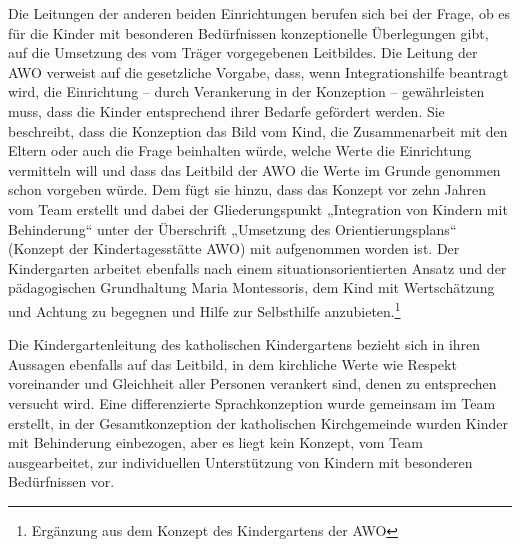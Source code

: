 Die Leitungen der anderen beiden Einrichtungen berufen sich bei der Frage, ob es für die Kinder mit besonderen Bedürfnissen konzeptionelle Überlegungen gibt, auf die Umsetzung des vom Träger vorgegebenen Leitbildes. 
Die Leitung der AWO verweist auf die gesetzliche Vorgabe, dass, wenn Integrationshilfe beantragt wird, die Einrichtung -- durch Verankerung in der Konzeption -- gewährleisten muss, dass die Kinder entsprechend ihrer Bedarfe gefördert werden. Sie beschreibt, dass die Konzeption das Bild vom Kind, die Zusammenarbeit mit den Eltern oder auch die Frage beinhalten würde, welche Werte die Einrichtung vermitteln will und dass das Leitbild der AWO die Werte im Grunde genommen schon vorgeben würde. Dem fügt sie hinzu, dass das Konzept vor zehn Jahren vom Team erstellt und dabei der Gliederungspunkt „Integration von Kindern mit Behinderung“ unter der Überschrift „Umsetzung des Orientierungsplans“ (Konzept der Kindertagesstätte AWO) mit aufgenommen worden ist.
Der Kindergarten arbeitet ebenfalls nach einem situationsorientierten Ansatz und der pädagogischen Grundhaltung Maria Montessoris, dem Kind mit Wertschätzung und Achtung zu begegnen und Hilfe zur Selbsthilfe anzubieten.\footnote{Ergänzung aus dem Konzept des Kindergartens der AWO}

Die Kindergartenleitung des katholischen Kindergartens bezieht sich in ihren Aussagen ebenfalls auf das Leitbild, in dem kirchliche Werte wie Respekt voreinander und Gleichheit aller Personen verankert sind, denen zu entsprechen versucht wird. Eine differenzierte Sprachkonzeption wurde gemeinsam im Team erstellt, in der Gesamtkonzeption der katholischen Kirchgemeinde wurden Kinder mit Behinderung einbezogen, aber es liegt kein Konzept, vom Team ausgearbeitet, zur individuellen Unterstützung von Kindern mit besonderen Bedürfnissen vor. 


